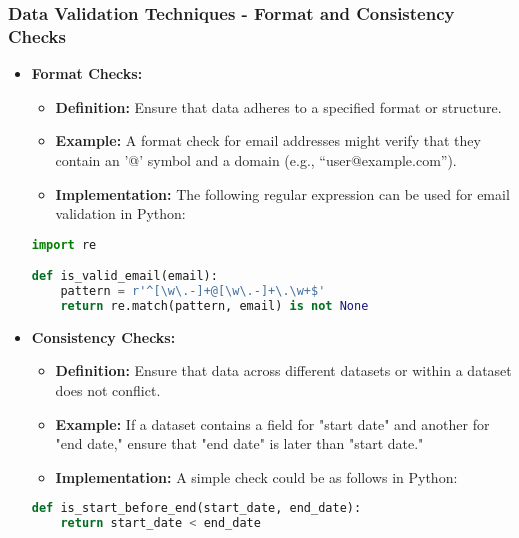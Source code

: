 \documentclass[aspectratio=169]{beamer}
\begin{document}
\begin{frame}[fragile]
    \frametitle{Data Validation Techniques - Format and Consistency Checks}
    \begin{itemize}
        \item \textbf{Format Checks:}
        \begin{itemize}
            \item \textbf{Definition:} Ensure that data adheres to a specified format or structure.
            \item \textbf{Example:} A format check for email addresses might verify that they contain an '@' symbol and a domain (e.g., “user@example.com”).
            \item \textbf{Implementation:} The following regular expression can be used for email validation in Python:
        \end{itemize}
        \begin{lstlisting}[language=Python]
import re

def is_valid_email(email):
    pattern = r'^[\w\.-]+@[\w\.-]+\.\w+$'
    return re.match(pattern, email) is not None
        \end{lstlisting}
        
        \item \textbf{Consistency Checks:}
        \begin{itemize}
            \item \textbf{Definition:} Ensure that data across different datasets or within a dataset does not conflict.
            \item \textbf{Example:} If a dataset contains a field for "start date" and another for "end date," ensure that "end date" is later than "start date."
            \item \textbf{Implementation:} A simple check could be as follows in Python:
        \end{itemize}
        \begin{lstlisting}[language=Python]
def is_start_before_end(start_date, end_date):
    return start_date < end_date
        \end{lstlisting}
    \end{itemize}
\end{frame}
\end{document}
